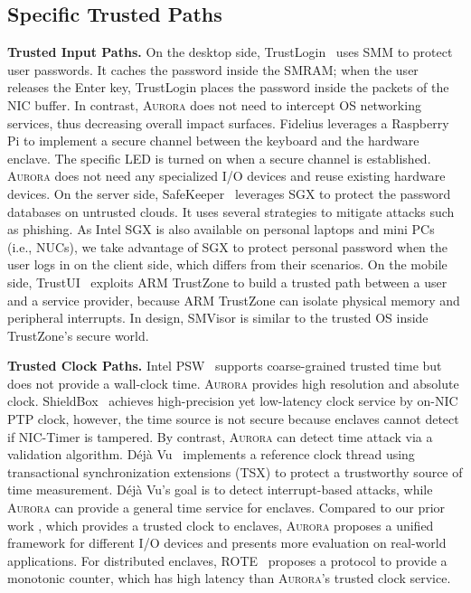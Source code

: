 \subsection{Specific Trusted Paths}

\textbf{Trusted Input Paths.}
On the desktop side, TrustLogin~\cite{zhang_trustlogin:_2015} uses SMM to protect user passwords. It caches the password inside the SMRAM; when the user releases the \textsf{Enter} key, TrustLogin places the password inside the packets of the NIC buffer. In contrast, \textsc{Aurora} does not need to intercept OS networking services, thus decreasing overall impact surfaces.
Fidelius \cite{DBLP:journals/corr/abs-1809-04774} leverages a Raspberry Pi to implement a secure channel between the keyboard and the hardware enclave. The specific LED is turned on when a secure channel is established.  \textsc{Aurora} does not need any specialized I/O devices and reuse existing hardware devices.
On the server side, SafeKeeper~\cite{DBLP:conf/www/KrawieckaKPMA18} leverages SGX to protect the password databases on untrusted clouds. It uses several strategies to mitigate attacks such as phishing. As Intel SGX is also available on personal laptops and mini PCs (i.e., NUCs), we take advantage of SGX to protect personal password when the user logs in on the client side, which differs from their scenarios.
On the mobile side, TrustUI~\cite{DBLP:conf/apsys/LiMHXZCL14} exploits ARM TrustZone to build a trusted path between a user and a service provider, because ARM TrustZone can isolate physical memory and peripheral interrupts. In design, SMVisor is similar to the trusted OS inside TrustZone's secure world.

\textbf{Trusted Clock Paths.} Intel PSW~\cite{intel_psw} supports coarse-grained trusted time but does not provide a wall-clock time. \textsc{Aurora} provides high resolution and absolute clock. ShieldBox~\cite{DBLP:conf/sosr/TrachKGABF18} achieves high-precision yet low-latency clock service by on-NIC PTP clock, however, the time source is not secure because enclaves cannot detect if NIC-Timer is tampered. By contrast, \textsc{Aurora} can detect time attack via a validation algorithm. Déjà Vu~\cite{DBLP:conf/ccs/ChenZRZ17} implements a reference clock thread using transactional synchronization extensions (TSX) to protect a trustworthy source of time measurement. Déjà Vu's goal is to detect interrupt-based attacks, while \textsc{Aurora} can provide a general time service for enclaves. Compared to our prior work \cite{DBLP:conf/eurosys/LiangL18}, which provides a trusted clock to enclaves, \textsc{Aurora} proposes a unified framework for different I/O devices and presents more evaluation on real-world applications. For distributed enclaves, ROTE~\cite{DBLP:conf/uss/MateticAKDSGJC17} proposes a protocol to provide a monotonic counter, which has high latency than \textsc{Aurora}'s trusted clock service.

